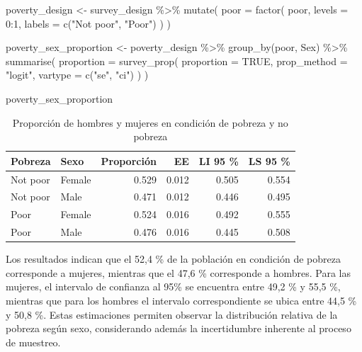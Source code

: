 \documentclass[
  spanish,
  11pt,
  letterpaper,
  oneside,
  open=any]{scrbook}
\newenvironment{Shaded}{\begin{snugshade}}{\end{snugshade}}
\newcommand{\AttributeTok}[1]{\textcolor[rgb]{0.40,0.45,0.13}{#1}}
\newcommand{\ConstantTok}[1]{\textcolor[rgb]{0.56,0.35,0.01}{#1}}
\newcommand{\DecValTok}[1]{\textcolor[rgb]{0.68,0.00,0.00}{#1}}
\newcommand{\FunctionTok}[1]{\textcolor[rgb]{0.28,0.35,0.67}{#1}}
\newcommand{\NormalTok}[1]{\textcolor[rgb]{0.00,0.23,0.31}{#1}}
\newcommand{\OtherTok}[1]{\textcolor[rgb]{0.00,0.23,0.31}{#1}}
\newcommand{\SpecialCharTok}[1]{\textcolor[rgb]{0.37,0.37,0.37}{#1}}
\newcommand{\StringTok}[1]{\textcolor[rgb]{0.13,0.47,0.30}{#1}}
\begin{document}
\begin{Shaded}
\begin{Highlighting}[]
\NormalTok{poverty\_design }\OtherTok{\textless{}{-}}\NormalTok{ survey\_design }\SpecialCharTok{\%\textgreater{}\%}
  \FunctionTok{mutate}\NormalTok{(}
    \AttributeTok{poor =} \FunctionTok{factor}\NormalTok{(}
\NormalTok{      poor,}
      \AttributeTok{levels =} \DecValTok{0}\SpecialCharTok{:}\DecValTok{1}\NormalTok{,}
      \AttributeTok{labels =} \FunctionTok{c}\NormalTok{(}\StringTok{"Not poor"}\NormalTok{, }\StringTok{"Poor"}\NormalTok{)}
\NormalTok{    )}
\NormalTok{  )}

\NormalTok{poverty\_sex\_proportion }\OtherTok{\textless{}{-}}\NormalTok{ poverty\_design }\SpecialCharTok{\%\textgreater{}\%}
  \FunctionTok{group\_by}\NormalTok{(poor, Sex) }\SpecialCharTok{\%\textgreater{}\%}
  \FunctionTok{summarise}\NormalTok{(}
    \AttributeTok{proportion =} \FunctionTok{survey\_prop}\NormalTok{(}
      \AttributeTok{proportion =} \ConstantTok{TRUE}\NormalTok{,}
      \AttributeTok{prop\_method =} \StringTok{"logit"}\NormalTok{,}
      \AttributeTok{vartype =} \FunctionTok{c}\NormalTok{(}\StringTok{"se"}\NormalTok{, }\StringTok{"ci"}\NormalTok{)}
\NormalTok{    )}
\NormalTok{  )}

\NormalTok{poverty\_sex\_proportion}
\end{Highlighting}
\end{Shaded}

{

\begin{longtable}[]{@{}llrrrr@{}}

\caption{\label{tbl-contingencia-pobreza-sexo}Proporción de hombres y
mujeres en condición de pobreza y no pobreza}

\tabularnewline

\toprule\noalign{}
Pobreza & Sexo & Proporción & EE & LI 95 \% & LS 95 \% \\
\midrule\noalign{}
\endhead
\bottomrule\noalign{}
\endlastfoot
Not poor & Female & 0.529 & 0.012 & 0.505 & 0.554 \\
Not poor & Male & 0.471 & 0.012 & 0.446 & 0.495 \\
Poor & Female & 0.524 & 0.016 & 0.492 & 0.555 \\
Poor & Male & 0.476 & 0.016 & 0.445 & 0.508 \\

\end{longtable}

}

Los resultados indican que el 52,4 \% de la población en condición de
pobreza corresponde a mujeres, mientras que el 47,6 \% corresponde a
hombres. Para las mujeres, el intervalo de confianza al 95\% se
encuentra entre 49,2 \% y 55,5 \%, mientras que para los hombres el
intervalo correspondiente se ubica entre 44,5 \% y 50,8 \%. Estas
estimaciones permiten observar la distribución relativa de la pobreza
según sexo, considerando además la incertidumbre inherente al proceso de
muestreo.
\end{document}
